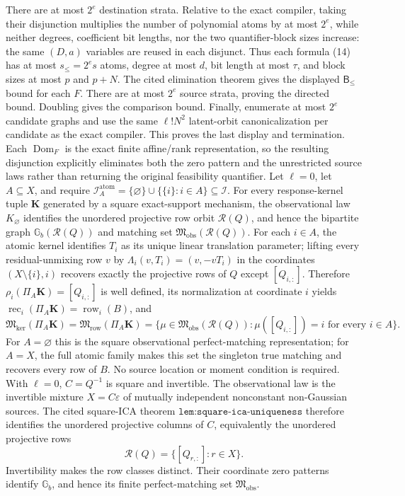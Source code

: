 There are at most \(2^e\) destination strata. Relative to the exact compiler, taking their disjunction multiplies the number of polynomial atoms by at most \(2^e\), while neither degrees, coefficient bit lengths, nor the two quantifier-block sizes increase: the same \((D,a)\) variables are reused in each disjunct. Thus each formula (14) has at most \(s_{\le}=2^es\) atoms, degree at most \(d\), bit length at most \(\tau\), and block sizes at most \(p\) and \(p+N\). The cited elimination theorem gives the displayed \(\mathsf B_{\le}\) bound for each \(F\). There are at most \(2^e\) source strata, proving the directed bound. Doubling gives the comparison bound. Finally, enumerate at most \(2^e\) candidate graphs and use the same \(\ell!N^2\) latent-orbit canonicalization per candidate as the exact compiler. This proves the last display and termination. Each \(\operatorname{Dom}_F\) is the exact finite affine/rank representation, so the resulting disjunction explicitly eliminates both the zero pattern and the unrestricted source laws rather than returning the original feasibility quantifier.
Let \(\ell=0\), let \(A\subseteq X\), and require \(\mathcal I_A^{\mathrm{atom}}=\{\varnothing\}\cup\{\{i\}:i\in A\}\subseteq\mathcal I\). For every response-kernel tuple \(\mathbf K\) generated by a square exact-support mechanism, the observational law \(K_{\varnothing}\) identifies the unordered projective row orbit \(\mathscr R(Q)\), and hence the bipartite graph \(\mathbb G_b(\mathscr R(Q))\) and matching set \(\mathfrak M_{\mathrm{obs}}(\mathscr R(Q))\). For each \(i\in A\), the atomic kernel identifies \(T_i\) as its unique linear translation parameter; lifting every residual-unmixing row \(v\) by \(\Lambda_i(v,T_i)=(v,-vT_i)\) in the coordinates \((X\setminus\{i\},i)\) recovers exactly the projective rows of \(Q\) except \([Q_{i,:}]\). Therefore \(\rho_i(\Pi_A\mathbf K)=[Q_{i,:}]\) is well defined, its normalization at coordinate \(i\) yields \(\operatorname{rec}_i(\Pi_A\mathbf K)=\operatorname{row}_i(B)\), and
\[
\mathfrak M_{\mathrm{ker}}(\Pi_A\mathbf K)=\mathfrak M_{\mathrm{row}}(\Pi_A\mathbf K)=\{\mu\in\mathfrak M_{\mathrm{obs}}(\mathscr R(Q)):\mu([Q_{i,:}])=i\text{ for every }i\in A\}.
\]
For \(A=\varnothing\) this is the square observational perfect-matching representation; for \(A=X\), the full atomic family makes this set the singleton true matching and recovers every row of \(B\). No source location or moment condition is required.
With \(\ell=0\), \(C=Q^{-1}\) is square and invertible. The observational law is the invertible mixture \(X=C\varepsilon\) of mutually independent nonconstant non-Gaussian sources. The cited square-ICA theorem \(\texttt{lem:square-ica-uniqueness}\) therefore identifies the unordered projective columns of \(C\), equivalently the unordered projective rows
\[
\mathscr R(Q)=\{[Q_{r,:}]:r\in X\}.
\]
Invertibility makes the row classes distinct. Their coordinate zero patterns identify \(\mathbb G_b\), and hence its finite perfect-matching set \(\mathfrak M_{\mathrm{obs}}\).

